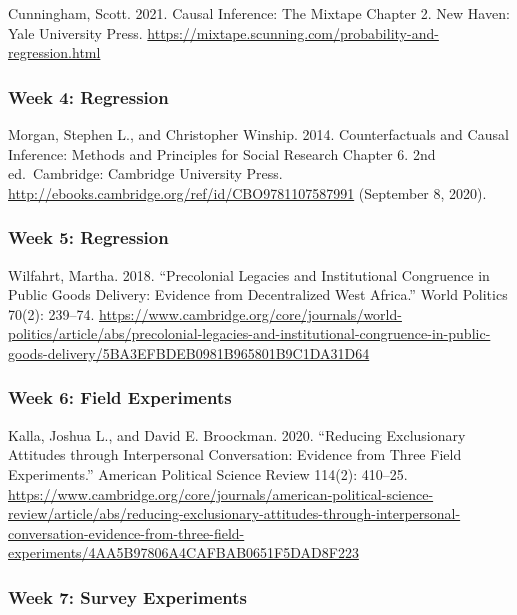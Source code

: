 \documentclass[
  11pt,
]{article}
\begin{document}
Cunningham, Scott. 2021. Causal Inference: The Mixtape Chapter 2. New
Haven: Yale University Press.
\url{https://mixtape.scunning.com/probability-and-regression.html}

\hypertarget{week-4-regression}{%
\subsubsection{Week 4: Regression}\label{week-4-regression}}

Morgan, Stephen L., and Christopher Winship. 2014. Counterfactuals and
Causal Inference: Methods and Principles for Social Research Chapter 6.
2nd ed.~Cambridge: Cambridge University Press.
\url{http://ebooks.cambridge.org/ref/id/CBO9781107587991} (September 8,
2020).

\hypertarget{week-5-regression}{%
\subsubsection{Week 5: Regression}\label{week-5-regression}}

Wilfahrt, Martha. 2018. ``Precolonial Legacies and Institutional
Congruence in Public Goods Delivery: Evidence from Decentralized West
Africa.'' World Politics 70(2): 239--74.
\url{https://www.cambridge.org/core/journals/world-politics/article/abs/precolonial-legacies-and-institutional-congruence-in-public-goods-delivery/5BA3EFBDEB0981B965801B9C1DA31D64}

\hypertarget{week-6-field-experiments}{%
\subsubsection{Week 6: Field
Experiments}\label{week-6-field-experiments}}

Kalla, Joshua L., and David E. Broockman. 2020. ``Reducing Exclusionary
Attitudes through Interpersonal Conversation: Evidence from Three Field
Experiments.'' American Political Science Review 114(2): 410--25.
\url{https://www.cambridge.org/core/journals/american-political-science-review/article/abs/reducing-exclusionary-attitudes-through-interpersonal-conversation-evidence-from-three-field-experiments/4AA5B97806A4CAFBAB0651F5DAD8F223}

\hypertarget{week-7-survey-experiments}{%
\subsubsection{Week 7: Survey
Experiments}\label{week-7-survey-experiments}}
\end{document}
